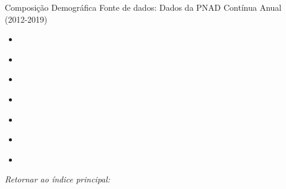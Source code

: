 \begin{frame}[label=_composicao_demografica]{Composição Demográfica}
{\footnotesize Fonte de dados: Dados da PNAD Contínua Anual (2012-2019)}



\begin{itemize}
\item{
	\hyperlink{_composicao_demografica_raca}{}
	}   
		
\item{
	\hyperlink{_composicao_demografica_genero}{}
	}  
	
\item{
	\hyperlink{_composicao_demografica_faixa_etaria}{}
	}  
	
\item{
	\hyperlink{_composicao_demografica_educacao}{} 
	}  
	
\item{
	\hyperlink{_composicao_demografica_setor}{}
	}  
	
\item{
	\hyperlink{_composicao_demografica_regiao_metro}{} 
	}
\item{
	\hyperlink{_composicao_demografica_rural_urbano}{} 
	} 	  

\end{itemize}
\begin{small}
\textit{Retornar ao índice principal: \hyperlink{indice_principal}{} }
\end{small}
\end{frame}











